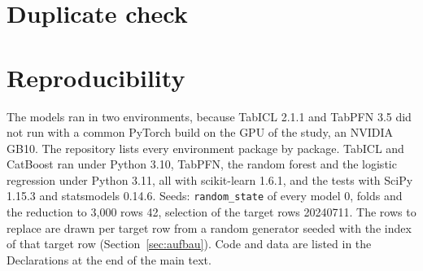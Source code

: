 \section{Duplicate check}\label{app:dup}

\section{Reproducibility}\label{app:repro}
\noindent The models ran in two environments, because TabICL 2.1.1 and TabPFN 3.5 did not run with a common PyTorch build on the GPU of the study, an NVIDIA GB10. The repository lists every environment package by package. TabICL and CatBoost ran under Python 3.10, TabPFN, the random forest and the logistic regression under Python 3.11, all with scikit-learn 1.6.1, and the tests with SciPy 1.15.3 and statsmodels 0.14.6. Seeds: \texttt{random\_state} of every model 0, folds and the reduction to 3,000 rows 42, selection of the target rows 20240711. The rows to replace are drawn per target row from a random generator seeded with the index of that target row (Section~\ref{sec:aufbau}). Code and data are listed in the Declarations at the end of the main text.
